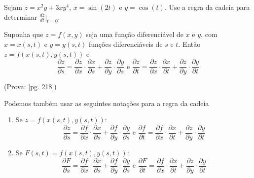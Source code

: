 \begin{exercise}
    Sejam \(z = x^2 y + 3x y^4\), \(x = \sin(2t)\) e \(y = \cos(t)\). Use a regra da cadeia para determinar \(\frac{dz}{dt}\big|_{t=0}\).
\end{exercise}

\begin{theorem}\label{thm.RegraDaCadeia2}
    Suponha que \(z = f(x,y)\) seja uma função diferenciável de \(x\) e \(y\), com \(x = x(s,t)\) e \(y = y(s,t)\) funções diferenciáveis de \(s\) e \(t\). Então \(z = f(x(s,t),y(s,t))\) e \[\frac{\partial z}{\partial s} = \frac{\partial z}{\partial x}\cdot\frac{\partial x}{\partial s} + \frac{\partial z}{\partial y}\cdot\frac{\partial y}{\partial s} \text{ e } \frac{\partial z}{\partial t} = \frac{\partial z}{\partial x}\cdot\frac{\partial x}{\partial t} + \frac{\partial z}{\partial y}\cdot\frac{\partial y}{\partial t}\]
\end{theorem}
(Prova: \cite{guidorizzi}[pg. 218])

Podemos também usar as seguintes notações para a regra da cadeia
    \begin{enumerate}
        \item Se \(z = f(x(s,t),y(s,t))\): \[\frac{\partial z}{\partial s} = \frac{\partial f}{\partial x}\cdot\frac{\partial x}{\partial s} + \frac{\partial f}{\partial y}\cdot\frac{\partial y}{\partial s} \text{ e } \frac{\partial f}{\partial t} = \frac{\partial f}{\partial x}\cdot\frac{\partial x}{\partial t} + \frac{\partial z}{\partial y}\cdot\frac{\partial y}{\partial t}\]
        \item Se \(F(s,t) = f(x(s,t),y(s,t))\): \[\frac{\partial F}{\partial s} = \frac{\partial f}{\partial x}\cdot\frac{\partial x}{\partial s} + \frac{\partial f}{\partial y}\cdot\frac{\partial y}{\partial s} \text{ e } \frac{\partial F}{\partial t} = \frac{\partial f}{\partial x}\cdot\frac{\partial x}{\partial t} + \frac{\partial z}{\partial y}\cdot\frac{\partial y}{\partial t}\]
    \end{enumerate}

